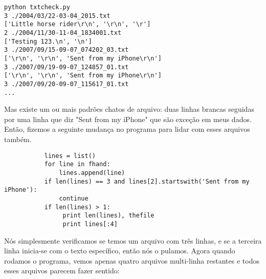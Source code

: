 \beforeverb
\begin{verbatim}
python txtcheck.py 
3 ./2004/03/22-03-04_2015.txt
['Little horse rider\r\n', '\r\n', '\r']
2 ./2004/11/30-11-04_1834001.txt
['Testing 123.\n', '\n']
3 ./2007/09/15-09-07_074202_03.txt
['\r\n', '\r\n', 'Sent from my iPhone\r\n']
3 ./2007/09/19-09-07_124857_01.txt
['\r\n', '\r\n', 'Sent from my iPhone\r\n']
3 ./2007/09/20-09-07_115617_01.txt
...
\end{verbatim}
\afterverb

Mas existe um ou mais padrões chatos de arquivo:
duas linhas brancas seguidas por uma linha que diz "Sent from my iPhone" que são exceção em meus dados.
Então, fizemos a seguinte mudança no programa para lidar com esses arquivos também.

\beforeverb
\begin{verbatim}
           lines = list()
           for line in fhand:
               lines.append(line)
           if len(lines) == 3 and lines[2].startswith('Sent from my iPhone'):
               continue
           if len(lines) > 1:
                print len(lines), thefile
                print lines[:4]
\end{verbatim}
\afterverb

Nós simplesmente verificamos se temos um arquivo com três linhas, e se a terceira linha inicia-se com o texto específico, então nós o pulamos. 
%
Agora quando rodamos o programa, vemos apenas quatro arquivos multi-linha restantes e todos esses arquivos parecem fazer sentido:

